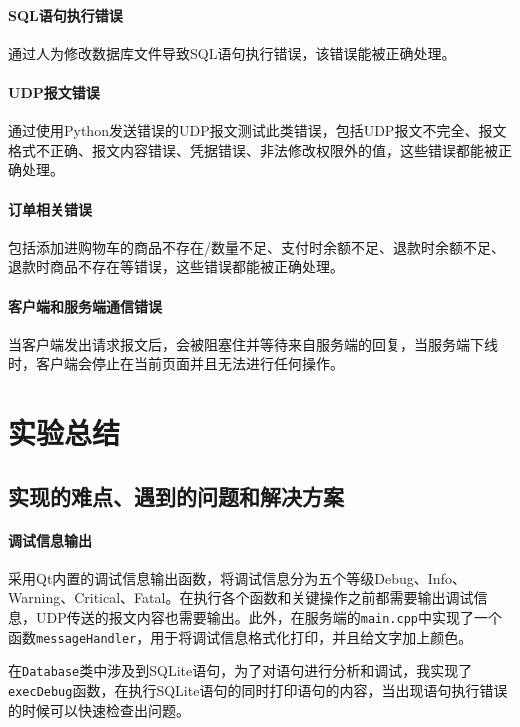 \documentclass[lang=cn,11pt,a4paper,cite=authornum]{paper}
\begin{document}
\paragraph{SQL语句执行错误} 通过人为修改数据库文件导致SQL语句执行错误，该错误能被正确处理。

\paragraph{UDP报文错误} 通过使用Python发送错误的UDP报文测试此类错误，包括UDP报文不完全、报文格式不正确、报文内容错误、凭据错误、非法修改权限外的值，这些错误都能被正确处理。

\paragraph{订单相关错误} 包括添加进购物车的商品不存在/数量不足、支付时余额不足、退款时余额不足、退款时商品不存在等错误，这些错误都能被正确处理。

\paragraph{客户端和服务端通信错误} 当客户端发出请求报文后，会被阻塞住并等待来自服务端的回复，当服务端下线时，客户端会停止在当前页面并且无法进行任何操作。

\section{实验总结}

\subsection{实现的难点、遇到的问题和解决方案}

\paragraph{调试信息输出} 采用Qt内置的调试信息输出函数，将调试信息分为五个等级Debug、Info、Warning、Critical、Fatal。在执行各个函数和关键操作之前都需要输出调试信息，UDP传送的报文内容也需要输出。此外，在服务端的\texttt{main.cpp}中实现了一个函数\texttt{messageHandler}，用于将调试信息格式化打印，并且给文字加上颜色。

在\texttt{Database}类中涉及到SQLite语句，为了对语句进行分析和调试，我实现了\texttt{execDebug}函数，在执行SQLite语句的同时打印语句的内容，当出现语句执行错误的时候可以快速检查出问题。
\end{document}
